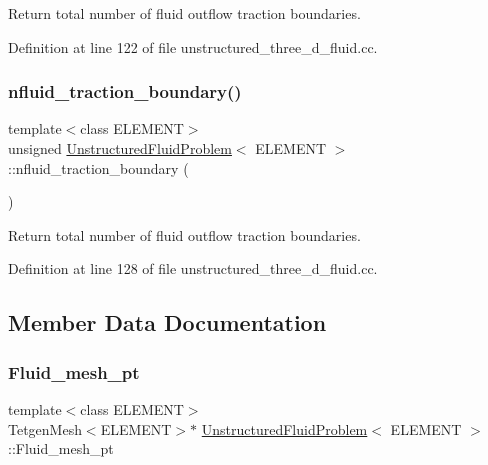Return total number of fluid outflow traction boundaries. 



Definition at line 122 of file unstructured\+\_\+three\+\_\+d\+\_\+fluid.\+cc.

\mbox{\label{classUnstructuredFluidProblem_ae04e768e915a5e097527cea22558203d}} 
\subsubsection{\texorpdfstring{nfluid\+\_\+traction\+\_\+boundary()}{nfluid\_traction\_boundary()}}
{\footnotesize\ttfamily template$<$class E\+L\+E\+M\+E\+NT$>$ \\
unsigned \hyperlink{classUnstructuredFluidProblem}{Unstructured\+Fluid\+Problem}$<$ E\+L\+E\+M\+E\+NT $>$\+::nfluid\+\_\+traction\+\_\+boundary (\begin{DoxyParamCaption}{ }\end{DoxyParamCaption})\hspace{0.3cm}{\ttfamily [inline]}}



Return total number of fluid outflow traction boundaries. 



Definition at line 128 of file unstructured\+\_\+three\+\_\+d\+\_\+fluid.\+cc.



\subsection{Member Data Documentation}
\mbox{\label{classUnstructuredFluidProblem_ade90cb92dd49b9d897ed538b1876b060}} 
\subsubsection{\texorpdfstring{Fluid\+\_\+mesh\+\_\+pt}{Fluid\_mesh\_pt}}
{\footnotesize\ttfamily template$<$class E\+L\+E\+M\+E\+NT$>$ \\
Tetgen\+Mesh$<$E\+L\+E\+M\+E\+NT$>$$\ast$ \hyperlink{classUnstructuredFluidProblem}{Unstructured\+Fluid\+Problem}$<$ E\+L\+E\+M\+E\+NT $>$\+::Fluid\+\_\+mesh\+\_\+pt}



